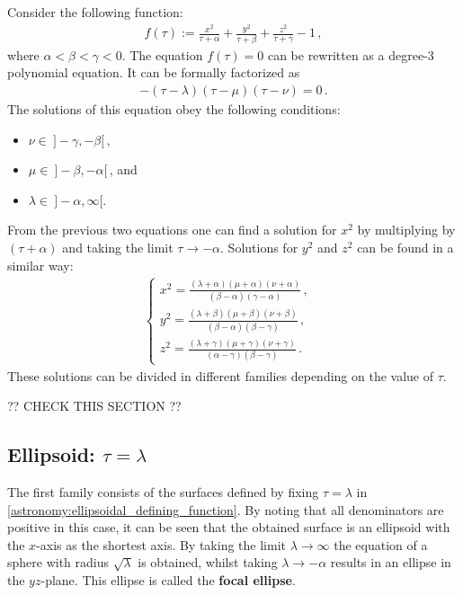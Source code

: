     Consider the following function:
    \begin{gather}
        \label{astronomy:ellipsoidal_defining_function}
        f(\tau) := \frac{x^2}{\tau + \alpha} + \frac{y^2}{\tau + \beta} + \frac{z^2}{\tau + \gamma} - 1\,,
    \end{gather}
    where $\alpha<\beta<\gamma<0$. The equation $f(\tau)=0$ can be rewritten as a degree-3 polynomial equation. It can be formally factorized as
    \begin{gather}
        -(\tau-\lambda)(\tau-\mu)(\tau-\nu) = 0\,.
    \end{gather}
    The solutions of this equation obey the following conditions:
    \begin{itemize}
        \item $\nu\in\ ]-\gamma,-\beta[$\,,
        \item $\mu\in\ ]-\beta,-\alpha[$\,, and
        \item $\lambda\in\ ]-\alpha,\infty[$.
    \end{itemize}
    From the previous two equations one can find a solution for $x^2$ by multiplying by $(\tau+\alpha)$ and taking the limit $\tau\rightarrow-\alpha$. Solutions for $y^2$ and $z^2$ can be found in a similar way:
    \begin{gather}
        \label{astronomy:ellipsoidal_coordinates}
        \begin{cases}
            x^2 = \frac{(\lambda + \alpha)(\mu + \alpha)(\nu + \alpha)}{(\beta - \alpha)(\gamma - \alpha)}\,,&\\
            y^2 = \frac{(\lambda + \beta)(\mu + \beta)(\nu + \beta)}{(\beta - \alpha)(\beta - \gamma)}\,,&\\
            z^2 = \frac{(\lambda + \gamma)(\mu + \gamma)(\nu + \gamma)}{(\alpha - \gamma)(\beta - \gamma)}\,.&
        \end{cases}
    \end{gather}
    These solutions can be divided in different families depending on the value of $\tau$.

    ?? CHECK THIS SECTION ??

\subsection{Ellipsoid: \texorpdfstring{$\tau=\lambda$}{tau equals lambda}}

    The first family consists of the surfaces defined by fixing $\tau=\lambda$ in \cref{astronomy:ellipsoidal_defining_function}. By noting that all denominators are positive in this case, it can be seen that the obtained surface is an ellipsoid with the $x$-axis as the shortest axis. By taking the limit $\lambda\longrightarrow\infty$ the equation of a sphere with radius $\sqrt{\lambda}$ is obtained, whilst taking $\lambda\longrightarrow-\alpha$ results in an ellipse in the $yz$-plane. This ellipse is called the \textbf{focal ellipse}.

